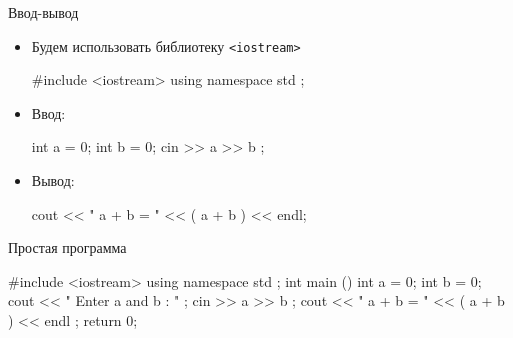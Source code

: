 \documentclass[9pt]{beamer}
\begin{document}
\begin{frame}[fragile]{Ввод-вывод}
    \begin{itemize}
        \item Будем использовать библиотеку \texttt{<iostream>}
        \begin{cppcode}
            #include <iostream>
            using namespace std ;

        \end{cppcode}
        \item Ввод:
        \begin{cppcode}
            int a = 0;
            int b = 0;
            cin >> a >> b ;
            
        \end{cppcode}
        \item Вывод:
        \begin{cppcode}
            cout << " a + b = " << ( a + b ) << endl;
        \end{cppcode}
    \end{itemize}
\end{frame}

\begin{frame}[fragile]{Простая программа}
    \begin{cppcode}
        #include <iostream>
        using namespace std ;
        int main ()
        {
            int a = 0;
            int b = 0;
            cout << " Enter a and b : " ;
            cin >> a >> b ;
            cout << " a + b = " << ( a + b ) << endl ;
            return 0;
        }
    \end{cppcode}
\end{frame}
\end{document}
